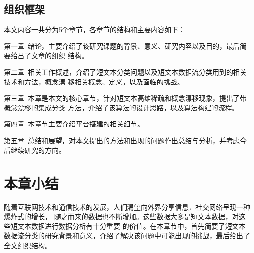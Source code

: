 \subsection{组织框架}
本文内容一共分为5个章节，各章节的结构和主要内容如下：

第一章\  绪论，主要介绍了该研究课题的背景、意义、研究内容以及目的，最后简要给出了文章的组织
结构。

第二章\ 相关工作概述，介绍了短文本分类问题以及短文本数据流分类用到的相关技术和方法，概念漂
移相关概念、定义，以及面临的挑战。

第三章\ 本章是本文的核心章节，针对短文本高维稀疏和概念漂移现象，提出了带概念漂移的集成分类
方法，介绍了该算法的设计思路，以及算法构建的流程。

第四章\ 本章节主要介绍平台搭建的相关细节。

第五章\ 总结和展望，对本文提出的方法和出现的问题作出总结与分析，并考虑今后继续研究的方向。

\section{本章小结}
随着互联网技术和通信技术的发展，人们渴望向外界分享信息，社交网络呈现一种爆炸式的增长，
随之而来的数据也不断增加。这些数据大多是短文本数据，对这些短文本数据进行数据分析有十分重要
的价值。在本章节中，首先简要了短文本数据流分类的研究背景和意义，介绍了解决该问题中可能出现的挑战，最后给出了全文组织结构。


